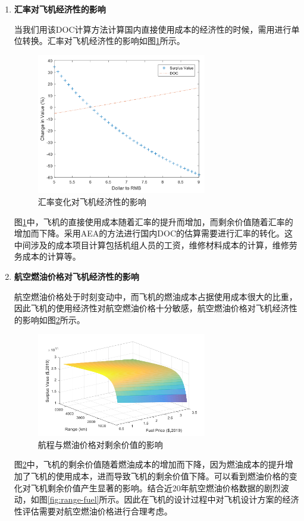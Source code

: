 \documentclass[12pt,a4paper]{report}
\begin{document}
\begin{enumerate}
\item \textbf{汇率对飞机经济性的影响}

当我们用该DOC计算方法计算国内直接使用成本的经济性的时候，需用进行单位转换。汇率对飞机经济性的影响如图\ref{fig:exchange}所示。

\begin{figure}[ht!]
	\centering
	\includegraphics[width=0.7\textwidth]{./media512/exchangerate.png}
	\caption{汇率变化对飞机经济性的影响}
	\label{fig:exchange}
\end{figure}

图\ref{fig:exchange}中，飞机的直接使用成本随着汇率的提升而增加，而剩余价值随着汇率的增加而下降。采用AEA的方法进行国内DOC的估算需要进行汇率的转化。这中间涉及的成本项目计算包括机组人员的工资，维修材料成本的计算，维修劳务成本的计算等。

\item \textbf{航空燃油价格对飞机经济性的影响}

航空燃油价格处于时刻变动中，而飞机的燃油成本占据使用成本很大的比重，因此飞机的使用经济性对航空燃油价格十分敏感，航空燃油价格对飞机经济性的影响如图\ref{fig:rangefueprice}所示。

\begin{figure}[ht!]
	\centering
	\includegraphics[width=0.7\textwidth]{./media512/range-fuelprice.png}
	\caption{航程与燃油价格对剩余价值的影响}
	\label{fig:rangefueprice}
\end{figure}
图\ref{fig:rangefueprice}中，飞机的剩余价值随着燃油成本的增加而下降，因为燃油成本的提升增加了飞机的使用成本，进而导致飞机的剩余价值下降。可以看到燃油价格的变化对飞机剩余价值产生显著的影响。结合近20年航空燃油价格数据的剧烈波动，如图\ref{fig:range-fuel}所示。因此在飞机的设计过程中对飞机设计方案的经济性评估需要对航空燃油价格进行合理考虑。


\end{enumerate}
\end{document}
